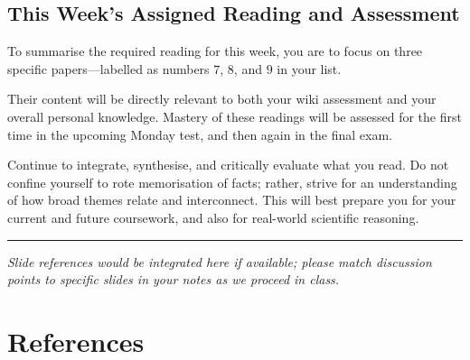 \documentclass[
  10pt,
]{book}
\begin{document}
\section{This Week's Assigned Reading and
Assessment}\label{this-weeks-assigned-reading-and-assessment}

To summarise the required reading for this week, you are to focus on
three specific papers---labelled as numbers \(7\), \(8\), and \(9\) in
your list.

Their content will be directly relevant to both your wiki assessment and
your overall personal knowledge. Mastery of these readings will be
assessed for the first time in the upcoming Monday test, and then again
in the final exam.

Continue to integrate, synthesise, and critically evaluate what you
read. Do not confine yourself to rote memorisation of facts; rather,
strive for an understanding of how broad themes relate and interconnect.
This will best prepare you for your current and future coursework, and
also for real-world scientific reasoning.

\begin{center}\rule{0.5\linewidth}{0.5pt}\end{center}

\emph{Slide references would be integrated here if available; please
match discussion points to specific slides in your notes as we proceed
in class.}

\chapter*{References}\label{references}
\end{document}
